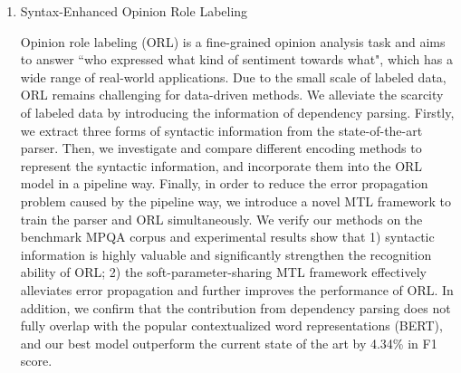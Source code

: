 \begin{eabstract}
\begin{enumerate}
		\item Syntax-Enhanced Opinion Role Labeling

		      Opinion role labeling (ORL) is a ﬁne-grained opinion analysis task and aims to answer ``who expressed what kind of sentiment towards what", which has a wide range of real-world applications.
		      Due to the small scale of labeled data, ORL remains challenging for data-driven methods.
		      We alleviate the scarcity of labeled data by introducing the information of dependency parsing.
		      Firstly, we extract three forms of syntactic information from the state-of-the-art parser.
		      Then, we investigate and compare different encoding methods to represent the syntactic information, and incorporate them into the ORL model in a pipeline way.
		      Finally, in order to reduce the error propagation problem caused by the pipeline way, we introduce a novel MTL framework to train the parser and ORL simultaneously.
		      We verify our methods on the benchmark MPQA corpus and experimental results show that 1) syntactic information is highly valuable and significantly strengthen the recognition ability of ORL; 2) the soft-parameter-sharing MTL framework effectively alleviates error propagation and further improves the performance of ORL.
		      In addition, we confirm that the contribution from dependency parsing does not fully overlap with the popular contextualized word representations (BERT), and our best model outperform the current state of the art by 4.34\% in F1 score.



\end{enumerate}
\end{eabstract}

